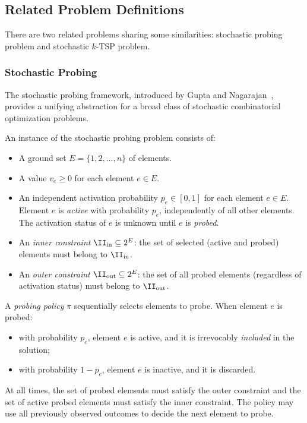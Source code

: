 \subsection{Related Problem Definitions}\label{sec:relateddef}

There are two related problems sharing some similarities: stochastic probing problem and stochastic $k$-TSP problem. 

\subsubsection{Stochastic Probing}

The stochastic probing framework, introduced by Gupta and Nagarajan~\cite{GuptaNagarajan2013}, provides a unifying abstraction for a broad class of stochastic combinatorial optimization problems.

\begin{definition}
    An instance of the stochastic probing problem consists of:
    \begin{itemize}
        \item A ground set $E = \{1, 2, \dots, n\}$ of elements.
        \item A value $v_e \ge 0$ for each element $e \in E$.
        \item An independent activation probability $p_e \in [0,1]$ for each element $e \in E$. Element $e$ is \emph{active} with probability $p_e$, independently of all other elements. The activation status of $e$ is unknown until $e$ is \emph{probed}.
        \item An \emph{inner constraint} $\II_{\mathrm{in}} \subseteq 2^E$: the set of selected (active and probed) elements must belong to $\II_{\mathrm{in}}$.
        \item An \emph{outer constraint} $\II_{\mathrm{out}} \subseteq 2^E$: the set of all probed elements (regardless of activation status) must belong to $\II_{\mathrm{out}}$.
    \end{itemize}
\end{definition}

A \emph{probing policy} $\pi$ sequentially selects elements to probe. When element $e$ is probed:
\begin{itemize}
    \item with probability $p_e$, element $e$ is active, and it is irrevocably \emph{included} in the solution;
    \item with probability $1 - p_e$, element $e$ is inactive, and it is discarded.
\end{itemize}
At all times, the set of probed elements must satisfy the outer constraint and the set of active probed elements must satisfy the inner constraint. The policy may use all previously observed outcomes to decide the next element to probe.

